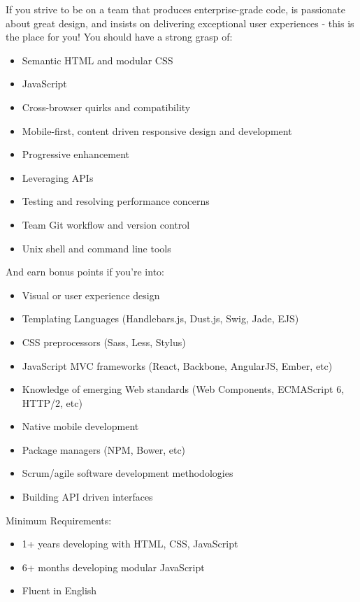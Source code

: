 If you strive to be on a team that produces enterprise-grade code, is passionate about great design, and insists on delivering exceptional user experiences - this is the place for you! You should have a strong grasp of:

\begin{itemize}
\item Semantic HTML and modular CSS
\item JavaScript
\item Cross-browser quirks and compatibility
\item Mobile-first, content driven responsive design and development
\item Progressive enhancement
\item Leveraging APIs
\item Testing and resolving performance concerns
\item Team Git workflow and version control
\item Unix shell and command line tools
\end{itemize}

And earn bonus points if you're into:
\begin{itemize}
\item Visual or user experience design
\item Templating Languages (Handlebars.js, Dust.js, Swig, Jade, EJS)
\item CSS preprocessors (Sass, Less, Stylus)
\item JavaScript MVC frameworks (React, Backbone, AngularJS, Ember, etc)
\item Knowledge of emerging Web standards (Web Components, ECMAScript 6, HTTP/2, etc)
\item Native mobile development
\item Package managers (NPM, Bower, etc)
\item Scrum/agile software development methodologies
\item Building API driven interfaces
\end{itemize}

Minimum Requirements:
\begin{itemize}
\item 1+ years developing with HTML, CSS, JavaScript
\item 6+ months developing modular JavaScript
\item Fluent in English
\end{itemize}
